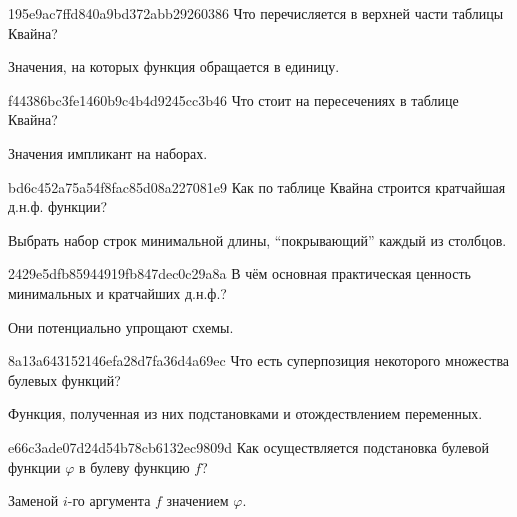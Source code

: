 \begin{note}{195e9ac7ffd840a9bd372abb29260386}
    Что перечисляется в верхней части таблицы Квайна?

    \begin{cloze}{1}
        Значения, на которых функция обращается в единицу.
    \end{cloze}
\end{note}

\begin{note}{f44386bc3fe1460b9c4b4d9245cc3b46}
    Что стоит на пересечениях в таблице Квайна?

    \begin{cloze}{1}
        Значения импликант на наборах.
    \end{cloze}
\end{note}

\begin{note}{bd6c452a75a54f8fac85d08a227081e9}
    Как по таблице Квайна строится кратчайшая д.н.ф. функции?

    \begin{cloze}{1}
        Выбрать набор строк минимальной длины, ``покрывающий'' каждый из столбцов.
    \end{cloze}
\end{note}

\begin{note}{2429e5dfb85944919fb847dec0c29a8a}
    В чём основная практическая ценность минимальных и кратчайших д.н.ф.?

    \begin{cloze}{1}
        Они потенциально упрощают схемы.
   \end{cloze}
\end{note}

\begin{note}{8a13a643152146efa28d7fa36d4a69ec}
    Что есть суперпозиция некоторого множества булевых функций?

    \begin{cloze}{1}
        Функция, полученная из них подстановками и отождествлением переменных.
    \end{cloze}
\end{note}

\begin{note}{e66c3ade07d24d54b78cb6132ec9809d}
    Как осуществляется подстановка булевой функции \({ \varphi }\) в булеву функцию \({ f }\)?

    \begin{cloze}{1}
        Заменой \({ i }\)-го аргумента \({ f }\) значением \({ \varphi }\).
    \end{cloze}
\end{note}

